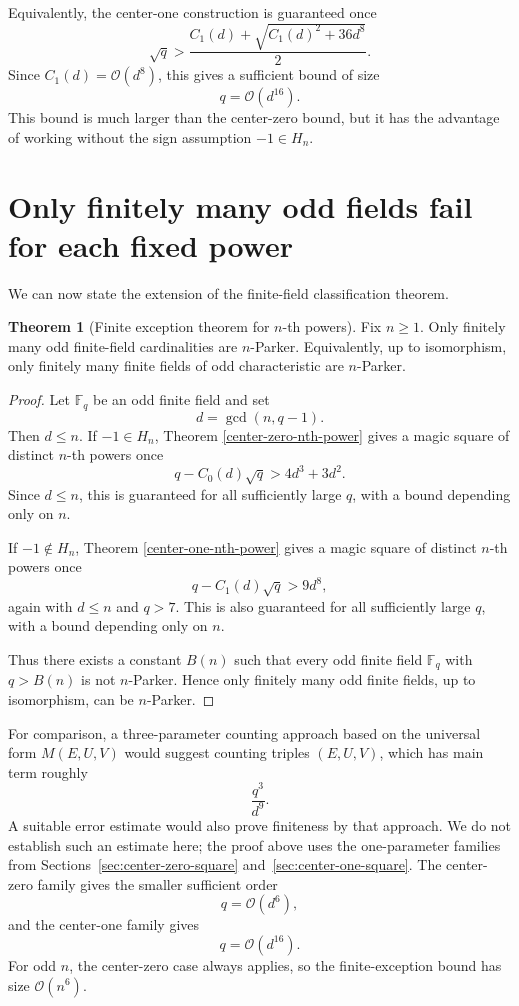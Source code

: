 \documentclass{article}
\newcommand{\mc}{\mathcal}
\newcommand{\F}{\mathbb F}
\theoremstyle{definition}
\newtheorem{theorem}{Theorem}
\numberwithin{equation}{section}
\begin{document}
Equivalently, the center-one construction is guaranteed once
\[
\sqrt q>
\frac{C_1(d)+\sqrt{C_1(d)^2+36d^8}}{2}.
\]
Since \(C_1(d)=\mc{O}(d^8)\), this gives a sufficient bound of size
\[
q=\mc{O}(d^{16}).
\]
This bound is much larger than the center-zero bound, but it has the advantage of
working without the sign assumption \(-1\in H_n\).

\section{Only finitely many odd fields fail for each fixed power}

We can now state the extension of the finite-field classification theorem.

\begin{theorem}[Finite exception theorem for \(n\)-th powers]
Fix \(n\geq1\). Only finitely many odd finite-field cardinalities are
\(n\)-Parker. Equivalently, up to isomorphism, only finitely many finite
fields of odd characteristic are \(n\)-Parker.
\end{theorem}

\begin{proof}
Let \(\F_q\) be an odd finite field and set
\[
d=\gcd(n,q-1).
\]
Then \(d\leq n\).  If \(-1\in H_n\), Theorem
\ref{center-zero-nth-power} gives a magic square of distinct \(n\)-th powers once
\[
q-C_0(d)\sqrt q>4d^3+3d^2.
\]
Since \(d\leq n\), this is guaranteed for all sufficiently large \(q\), with a
bound depending only on \(n\).

If \(-1\notin H_n\), Theorem \ref{center-one-nth-power} gives a magic square of
distinct \(n\)-th powers once
\[
q-C_1(d)\sqrt q>9d^8,
\]
again with \(d\leq n\) and \(q>7\). This is also guaranteed for all sufficiently large
\(q\), with a bound depending only on \(n\).

Thus there exists a constant \(B(n)\) such that every odd finite field
\(\F_q\) with \(q>B(n)\) is not \(n\)-Parker.  Hence only finitely many odd finite
fields, up to isomorphism, can be \(n\)-Parker.
\end{proof}

For comparison, a three-parameter counting approach based on the universal form \(M(E,U,V)\) would suggest counting triples \((E,U,V)\), which
has main term roughly
\[
\frac{q^3}{d^9}.
\]
A suitable error estimate would also prove finiteness by that approach. We do
not establish such an estimate here; the proof above uses the one-parameter families
from Sections~\ref{sec:center-zero-square} and~\ref{sec:center-one-square}.  The center-zero family gives the smaller sufficient order
\[
q=\mc{O}(d^6),
\]
and the center-one family gives
\[
q=\mc{O}(d^{16}).
\]
For odd \(n\), the center-zero case always applies, so the finite-exception bound
has size \(\mc{O}(n^6)\).
\end{document}
